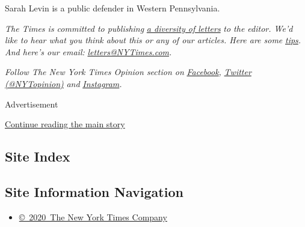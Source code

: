 Sarah Levin is a public defender in Western Pennsylvania.

\emph{The Times is committed to publishing}
\href{https://www.nytimes3xbfgragh.onion/2019/01/31/opinion/letters/letters-to-editor-new-york-times-women.html}{\emph{a
diversity of letters}} \emph{to the editor. We'd like to hear what you
think about this or any of our articles. Here are some}
\href{https://help.nytimes3xbfgragh.onion/hc/en-us/articles/115014925288-How-to-submit-a-letter-to-the-editor}{\emph{tips}}\emph{.
And here's our email:}
\href{mailto:letters@NYTimes.com}{\emph{letters@NYTimes.com}}\emph{.}

\emph{Follow The New York Times Opinion section on}
\href{https://www.facebookcorewwwi.onion/nytopinion}{\emph{Facebook}}\emph{,}
\href{http://twitter.com/NYTOpinion}{\emph{Twitter (@NYTopinion)}}
\emph{and}
\href{https://www.instagram.com/nytopinion/}{\emph{Instagram}}\emph{.}

Advertisement

\protect\hyperlink{after-bottom}{Continue reading the main story}

\hypertarget{site-index}{%
\subsection{Site Index}\label{site-index}}

\hypertarget{site-information-navigation}{%
\subsection{Site Information
Navigation}\label{site-information-navigation}}

\begin{itemize}
\tightlist
\item
  \href{https://help.nytimes3xbfgragh.onion/hc/en-us/articles/115014792127-Copyright-notice}{©~2020~The
  New York Times Company}
\end{itemize}


